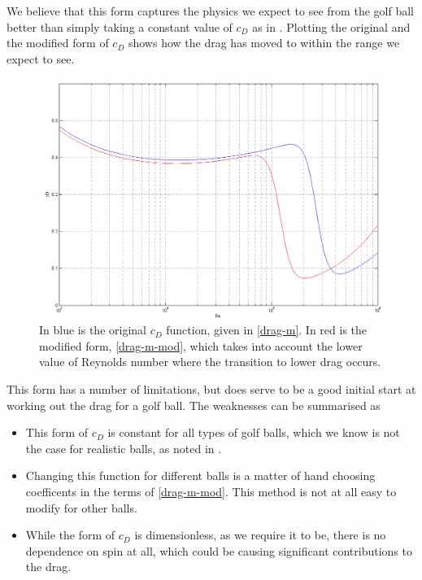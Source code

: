 We believe that this form captures the physics we expect to see from the golf ball better than simply
taking a constant value of $c_D$ as in \citet{Robinson2013}. Plotting the original and the modified
form of $c_D$ shows how the drag has moved to within the range we expect to see.
\begin{figure}
\centering
\includegraphics[scale=0.55]{../images/morrison-modified.png}
\caption[Plotting the original Morrison form against a modified version for golf balls]{In blue is the
original $c_D$ function, given in \eqref{drag-m}. In red is the modified form, \eqref{drag-m-mod}, which
takes into account the lower value of Reynolds number where the transition to lower drag occurs.}
\end{figure}

This form has a number of limitations, but does serve to be a good initial start at working out the 
drag for a golf ball. The weaknesses can be summarised as
\begin{itemize}
\item This form of $c_D$ is constant for all types of golf balls, which we know is not the case for
realistic balls, as noted in \citet{Alam2011}.
\item Changing this function for different balls is a matter of hand choosing coefficents in the terms
of \eqref{drag-m-mod}. This method is not at all easy to modify for other balls.
\item While the form of $c_D$ is dimensionless, as we require it to be, there is no dependence on spin
at all, which could be causing significant contributions to the drag.
\end{itemize}

